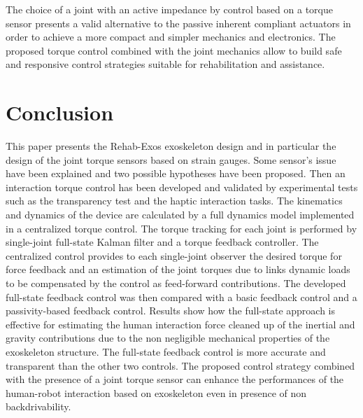 \documentclass[journal]{IEEEtran}
\begin{document}
\par The choice of a joint with an active impedance by control based on a torque sensor presents a valid alternative to the passive inherent compliant actuators in order to achieve a more compact and simpler mechanics and electronics. The proposed torque control combined with the joint mechanics allow to build safe and responsive control strategies suitable for rehabilitation and assistance. 


\section{Conclusion} \label{sec:conclusion}
This paper presents the Rehab-Exos exoskeleton design and in particular the design of the joint torque sensors based on strain gauges. Some sensor's issue have been explained and two possible hypotheses have been proposed. Then an interaction torque control has been developed and validated by experimental tests such as the transparency test and the haptic interaction tasks. The kinematics and dynamics of the device are calculated by a full dynamics model implemented in a centralized torque control. The torque tracking for each joint is performed by single-joint full-state Kalman filter and a torque feedback controller. The centralized control provides to each single-joint observer the desired torque for force feedback and an estimation of the joint torques due to links dynamic loads to be compensated by the control as feed-forward contributions. The developed full-state feedback control was then compared with a basic feedback control and a passivity-based feedback control. Results show how the  full-state approach is effective for estimating the human interaction force cleaned up of the inertial and gravity contributions due to the non negligible mechanical properties of the exoskeleton structure. The full-state feedback control is more accurate and transparent than the other two controls. The proposed control strategy combined with the presence of a joint torque sensor can enhance the performances of the human-robot interaction based on exoskeleton even in presence of non backdrivability.
%
\end{document}
